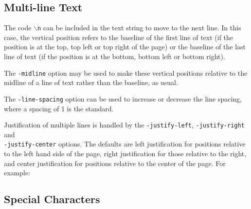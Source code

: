 \documentclass{book}
\begin{document}
\subsection{Multi-line Text}

The code \texttt{$\backslash$n} can be included in the text string to move to
the next line. In this case, the vertical position refers to the baseline of
the first line of text (if the position is at the top, top left or top right of
the page) or the baseline of the last line of text (if the position is at the
bottom, bottom left or bottom right).

\noindent{}



\noindent The \texttt{-midline} option may be used to make these vertical positions
relative to the midline of a line of text rather than the baseline, as usual.

The \texttt{-line-spacing} option can be used to increase or decrease the line
spacing, where a spacing of 1 is the standard.

\noindent{}


\noindent Justification of multiple lines is handled by the \texttt{-justify-left}, 
\texttt{-justify-right} and\\ \texttt{-justify-center} options. The defaults are
left justification for positions relative to the left hand side of the page,
right justification for those relative to the right, and center justification
for positions relative to the center of the page. For example:

\noindent{}


\subsection{Special Characters}
\end{document}
